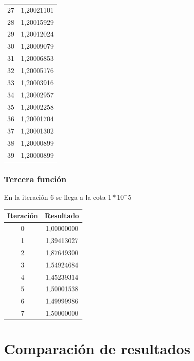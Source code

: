 \documentclass[titlepage,a4paper]{article}
\begin{document}
\begin{multicols}{2}
\begin{center}
\begin{tabular}{| c | c |}
            27    & 1,20021101 \\
            28    & 1,20015929 \\
            29    & 1,20012024 \\
            30    & 1,20009079 \\
            31    & 1,20006853 \\
            32    & 1,20005176 \\
            33    & 1,20003916 \\
            34    & 1,20002957 \\
            35    & 1,20002258 \\
            36    & 1,20001704 \\
            37    & 1,20001302 \\
            38    & 1,20000899 \\
            39    & 1,20000899 \\
        \hline
        \end{tabular}
    \end{center}
\end{multicols}

\subsubsection{Tercera función}\label{sec:sec3}
En la iteración 6 se llega a la cota $1*10^-5$
\begin{center}
\begin{tabular}{| c | c |}
    \hline
     Iteración & Resultado \\ \hline
        0     & 1,00000000 \\
        1     & 1,39413027 \\
        2     & 1,87649300 \\
        3     & 1,54924684 \\
        4     & 1,45239314 \\
        5     & 1,50001538 \\
        6     & 1,49999986 \\
        7     & 1,50000000 \\
    \hline
    \end{tabular}
\end{center}

\section{Comparación de resultados}\label{sec:comparacion_resultados}
\end{document}
